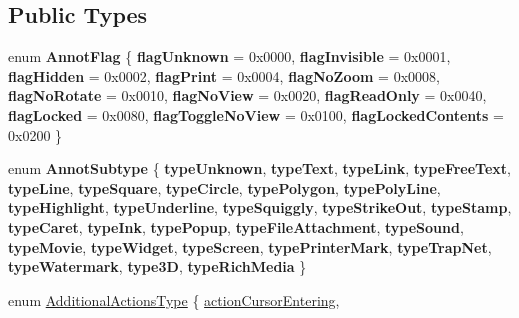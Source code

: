 \subsection*{Public Types}
\begin{DoxyCompactItemize}
\item 
\mbox{\label{class_annot_a3fcfaee6be9afb0ef0e5d1e1ca318b5c}} 
enum {\bfseries Annot\+Flag} \{ \newline
{\bfseries flag\+Unknown} = 0x0000, 
{\bfseries flag\+Invisible} = 0x0001, 
{\bfseries flag\+Hidden} = 0x0002, 
{\bfseries flag\+Print} = 0x0004, 
\newline
{\bfseries flag\+No\+Zoom} = 0x0008, 
{\bfseries flag\+No\+Rotate} = 0x0010, 
{\bfseries flag\+No\+View} = 0x0020, 
{\bfseries flag\+Read\+Only} = 0x0040, 
\newline
{\bfseries flag\+Locked} = 0x0080, 
{\bfseries flag\+Toggle\+No\+View} = 0x0100, 
{\bfseries flag\+Locked\+Contents} = 0x0200
 \}
\item 
\mbox{\label{class_annot_a52347b3463d5c324ea700f452faa97bc}} 
enum {\bfseries Annot\+Subtype} \{ \newline
{\bfseries type\+Unknown}, 
{\bfseries type\+Text}, 
{\bfseries type\+Link}, 
{\bfseries type\+Free\+Text}, 
\newline
{\bfseries type\+Line}, 
{\bfseries type\+Square}, 
{\bfseries type\+Circle}, 
{\bfseries type\+Polygon}, 
\newline
{\bfseries type\+Poly\+Line}, 
{\bfseries type\+Highlight}, 
{\bfseries type\+Underline}, 
{\bfseries type\+Squiggly}, 
\newline
{\bfseries type\+Strike\+Out}, 
{\bfseries type\+Stamp}, 
{\bfseries type\+Caret}, 
{\bfseries type\+Ink}, 
\newline
{\bfseries type\+Popup}, 
{\bfseries type\+File\+Attachment}, 
{\bfseries type\+Sound}, 
{\bfseries type\+Movie}, 
\newline
{\bfseries type\+Widget}, 
{\bfseries type\+Screen}, 
{\bfseries type\+Printer\+Mark}, 
{\bfseries type\+Trap\+Net}, 
\newline
{\bfseries type\+Watermark}, 
{\bfseries type3D}, 
{\bfseries type\+Rich\+Media}
 \}
\item 
enum \hyperlink{class_annot_aee99d73d7beb3a7aef74f6bc68cc797f}{Additional\+Actions\+Type} \{ \newline
\hyperlink{class_annot_aee99d73d7beb3a7aef74f6bc68cc797fa951c5e1f83223c0e9f4f3ddf56b69a1a}{action\+Cursor\+Entering}, 

\end{DoxyCompactItemize}
